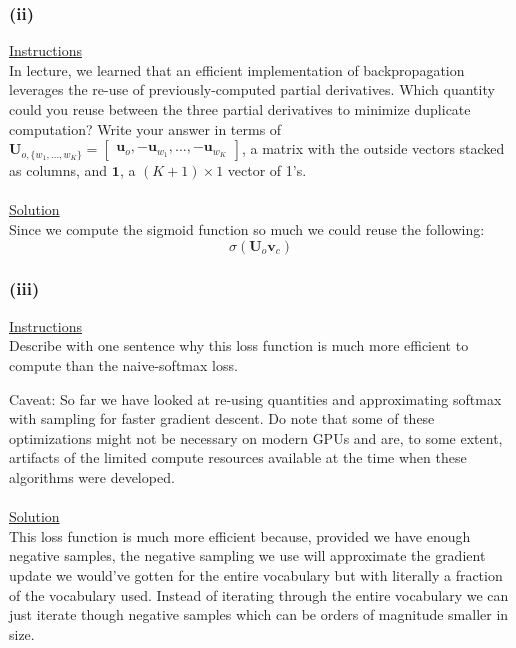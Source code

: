 \documentclass[12pt]{article}
\begin{document}
    
\subsubsection{(ii)}
\underline{Instructions}
~\\
In lecture, we learned that an efficient implementation of backpropagation leverages the re-use of 
previously-computed partial derivatives. Which quantity could you reuse between the three partial derivatives 
to minimize duplicate computation? Write your answer in terms of 
$\bm{U}_{o, \{w_1, \dots, w_K\}} = \begin{bmatrix} \bm{u}_o, -\bm{u}_{w_1}, \dots, -\bm{u}_{w_K} \end{bmatrix}$, 
a matrix with the outside vectors stacked as columns, and $\bm{1}$, a $(K + 1) \times 1$ vector of 1's. 
~\\
~\\
\underline{Solution}
~\\
Since we compute the sigmoid function so much we could reuse the following: 
\begin{equation*}
    \sigma (\bm U_{o} \bm v_c)
\end{equation*}
\subsubsection{(iii)}
\underline{Instructions}
~\\
Describe with one sentence why this loss function is much more efficient to compute than the naive-softmax loss.

Caveat: So far we have looked at re-using quantities and approximating softmax with sampling for faster 
gradient descent. Do note that some of these optimizations might not be necessary on modern GPUs and are, 
to some extent, artifacts of the limited compute resources available at the time when these algorithms were developed.
~\\
~\\
\underline{Solution}
~\\
This loss function is much more efficient because, provided we have enough negative samples, the negative 
sampling we use will approximate the gradient update we would've gotten for the entire vocabulary but 
with literally a fraction of the vocabulary used. Instead of iterating through the entire vocabulary we 
can just iterate though negative samples which can be orders of magnitude smaller in size. 
\end{document}
